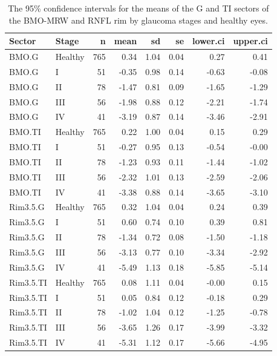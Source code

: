 \documentclass[fleqn,10pt]{wlscirep}
\begin{document}
\begin{table}[ht]
\centering
\begin{tabular}{llrrrrrr}
\toprule
\bf Sector & \bf Stage & \bf n & \bf mean & \bf sd & \bf se & \bf lower.ci & \bf upper.ci \\ 
\midrule
BMO.G & Healthy & 765 & 0.34 & 1.04 & 0.04 & 0.27 & 0.41 \\ 
BMO.G & I &  51 & -0.35 & 0.98 & 0.14 & -0.63 & -0.08 \\ 
BMO.G & II &  78 & -1.47 & 0.81 & 0.09 & -1.65 & -1.29 \\ 
BMO.G & III &  56 & -1.98 & 0.88 & 0.12 & -2.21 & -1.74 \\ 
BMO.G & IV &  41 & -3.19 & 0.87 & 0.14 & -3.46 & -2.91 \\ 
BMO.TI & Healthy & 765 & 0.22 & 1.00 & 0.04 & 0.15 & 0.29 \\ 
BMO.TI & I &  51 & -0.27 & 0.95 & 0.13 & -0.54 & -0.00 \\ 
BMO.TI & II &  78 & -1.23 & 0.93 & 0.11 & -1.44 & -1.02 \\ 
BMO.TI & III &  56 & -2.32 & 1.01 & 0.13 & -2.59 & -2.06 \\ 
BMO.TI & IV &  41 & -3.38 & 0.88 & 0.14 & -3.65 & -3.10 \\ 
Rim3.5.G & Healthy & 765 & 0.32 & 1.04 & 0.04 & 0.24 & 0.39 \\ 
Rim3.5.G & I &  51 & 0.60 & 0.74 & 0.10 & 0.39 & 0.81 \\ 
Rim3.5.G & II &  78 & -1.34 & 0.72 & 0.08 & -1.50 & -1.18 \\ 
Rim3.5.G & III &  56 & -3.13 & 0.77 & 0.10 & -3.34 & -2.92 \\ 
Rim3.5.G & IV &  41 & -5.49 & 1.13 & 0.18 & -5.85 & -5.14 \\ 
Rim3.5.TI & Healthy & 765 & 0.08 & 1.11 & 0.04 & -0.00 & 0.15 \\ 
Rim3.5.TI & I &  51 & 0.05 & 0.84 & 0.12 & -0.18 & 0.29 \\ 
Rim3.5.TI & II &  78 & -1.02 & 1.04 & 0.12 & -1.25 & -0.78 \\ 
Rim3.5.TI & III &  56 & -3.65 & 1.26 & 0.17 & -3.99 & -3.32 \\ 
Rim3.5.TI & IV &  41 & -5.31 & 1.12 & 0.17 & -5.66 & -4.95 \\ 
\bottomrule
\end{tabular}
\caption{The 95\% confidence intervals for the means of the G and TI sectors of the BMO-MRW and RNFL rim by glaucoma stages and healthy eyes.}
\label{tab:conficende-intervals}
\end{table}
\end{document}
